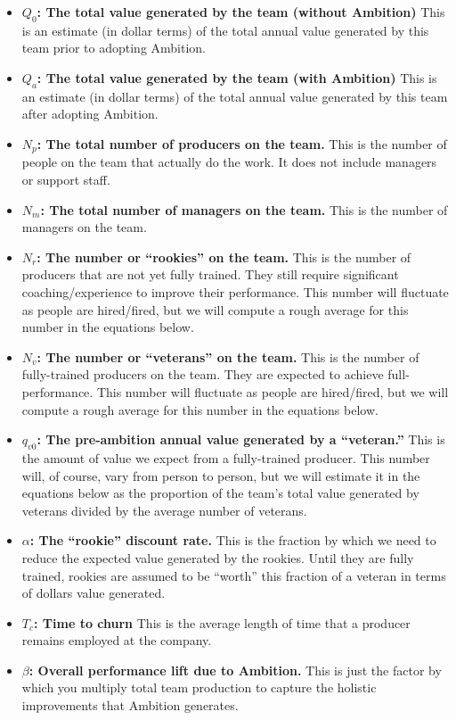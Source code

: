\documentclass[paper=a4, fontsize=11pt abstract]{scrartcl}
\numberwithin{equation}{section}		%
\numberwithin{figure}{section}			%
\numberwithin{table}{section}				%
\begin{document}
\begin{itemize}
    \item $Q_0$\textbf{: The total value generated by the team (without Ambition)}  This is an estimate (in dollar terms) of the total annual value generated by this team prior to adopting Ambition.
    \item $Q_a$\textbf{: The total value generated by the team (with Ambition)}  This is an estimate (in dollar terms) of the total annual value generated by this team after adopting Ambition.
    \item $N_p$\textbf{: The total number of producers on the team.}  This is the number of people on the team that actually do the work.  It does not include managers or support staff.
    \item $N_m$\textbf{: The total number of managers on the team.}  This is the number of managers on the team.
    \item $N_r$\textbf{: The number or ``rookies'' on the team.}  This is the number of producers that are not yet fully trained.  They still require significant coaching/experience to improve their performance. This number will fluctuate as people are hired/fired, but we will compute a rough average for this number in the equations below.
    \item $N_v$\textbf{: The number or ``veterans'' on the team.}  This is the number of fully-trained producers on the team. They are expected to achieve full-performance. This number will fluctuate as people are hired/fired, but we will compute a rough average for this number in the equations below.
    \item $q_{v0}$\textbf{: The pre-ambition annual value generated by a ``veteran.''}  This is the amount of value we expect from a fully-trained producer.  This number will, of course, vary from person to person, but we will estimate it in the equations below as the proportion of the team's total value generated by veterans divided by the average number of veterans.
    \item $\alpha$\textbf{: The ``rookie'' discount rate.}  This is the fraction by which we need to reduce the expected value generated by the rookies.  Until they are fully trained, rookies are assumed to be ``worth'' this fraction of a veteran in terms of dollars value generated.
    \item $T_c$\textbf{: Time to churn} This is the average length of time that a producer remains employed at the company.
    \item $\beta$\textbf{: Overall performance lift due to Ambition.} This is just the factor by which you multiply total team production to capture the holistic improvements that Ambition generates. 

\end{itemize}
\end{document}
